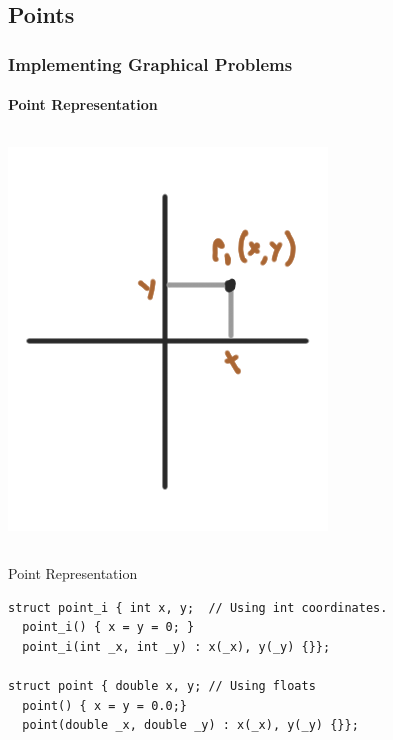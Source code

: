 \documentclass{beamer}
\begin{document}
\subsection{Points}
\begin{frame}[fragile]
  \frametitle{Implementing Graphical Problems}
  \framesubtitle{Point Representation}

  {\smaller
    \begin{columns}
      \includegraphics[width=.65\textwidth]{../img/geom2}
    \end{columns}

    \begin{exampleblock}{Point Representation}
\begin{verbatim}
struct point_i { int x, y;  // Using int coordinates.
  point_i() { x = y = 0; }
  point_i(int _x, int _y) : x(_x), y(_y) {}};

struct point { double x, y; // Using floats
  point() { x = y = 0.0;}
  point(double _x, double _y) : x(_x), y(_y) {}};
\end{verbatim}
    \end{exampleblock}
  }
\end{frame}
\end{document}
